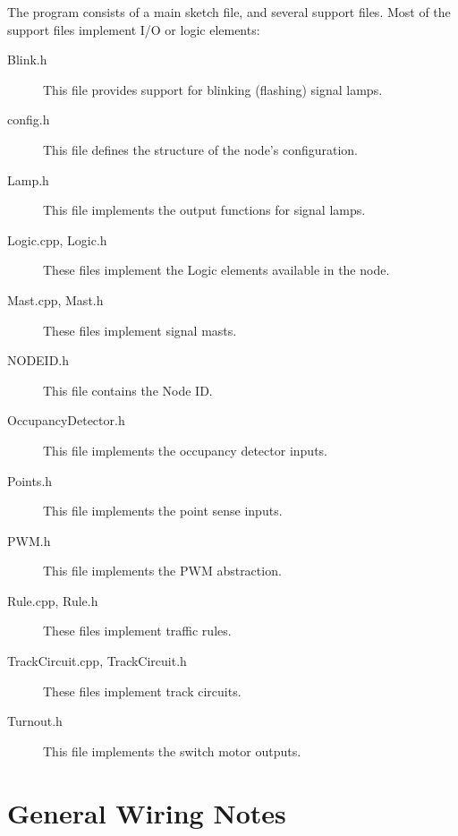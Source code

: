 The program consists of a main sketch file, and several support files.  Most 
of the support files implement I/O or logic elements:

\begin{description}
\item[Blink.h] This file provides support for blinking (flashing) signal 
lamps.
\item[config.h] This file defines the structure of the node's configuration.
\item[Lamp.h] This file implements the output functions for signal lamps.
\item[Logic.cpp, Logic.h] These files implement the Logic elements available 
in the node.
\item[Mast.cpp, Mast.h] These files implement signal masts.
\item[NODEID.h] This file contains the Node ID.
\item[OccupancyDetector.h] This file implements the occupancy detector inputs.
\item[Points.h] This file implements the point sense inputs.
\item[PWM.h] This file implements the PWM abstraction.
\item[Rule.cpp, Rule.h] These files implement traffic rules.
\item[TrackCircuit.cpp, TrackCircuit.h] These files implement track circuits.
\item[Turnout.h] This file implements the switch motor outputs.
\end{description}

\section{General Wiring Notes}

